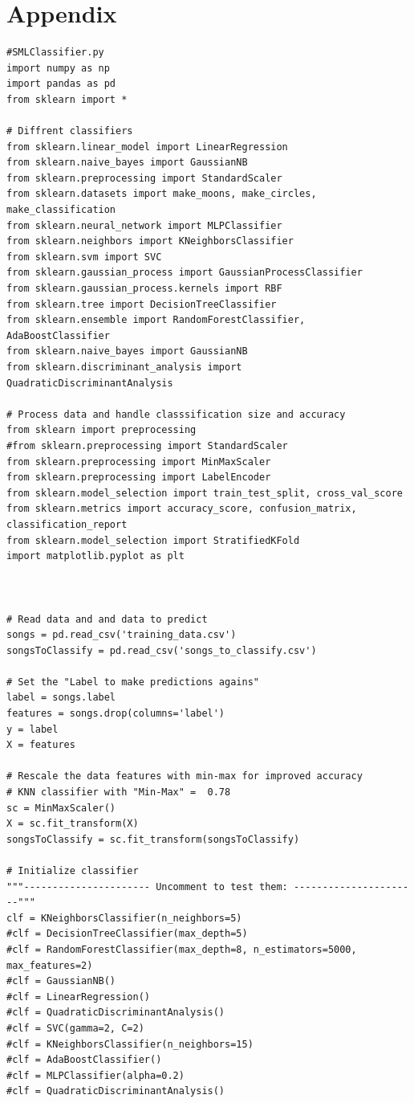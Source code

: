 \documentclass{article}
\begin{document}
\section*{Appendix}
\begin{verbatim}
#SMLClassifier.py
import numpy as np
import pandas as pd
from sklearn import *

# Diffrent classifiers
from sklearn.linear_model import LinearRegression  
from sklearn.naive_bayes import GaussianNB
from sklearn.preprocessing import StandardScaler
from sklearn.datasets import make_moons, make_circles, make_classification
from sklearn.neural_network import MLPClassifier
from sklearn.neighbors import KNeighborsClassifier
from sklearn.svm import SVC
from sklearn.gaussian_process import GaussianProcessClassifier
from sklearn.gaussian_process.kernels import RBF
from sklearn.tree import DecisionTreeClassifier
from sklearn.ensemble import RandomForestClassifier, AdaBoostClassifier
from sklearn.naive_bayes import GaussianNB
from sklearn.discriminant_analysis import QuadraticDiscriminantAnalysis

# Process data and handle classsification size and accuracy
from sklearn import preprocessing
#from sklearn.preprocessing import StandardScaler
from sklearn.preprocessing import MinMaxScaler
from sklearn.preprocessing import LabelEncoder
from sklearn.model_selection import train_test_split, cross_val_score
from sklearn.metrics import accuracy_score, confusion_matrix, classification_report
from sklearn.model_selection import StratifiedKFold
import matplotlib.pyplot as plt



# Read data and and data to predict
songs = pd.read_csv('training_data.csv')
songsToClassify = pd.read_csv('songs_to_classify.csv')

# Set the "Label to make predictions agains"
label = songs.label                         
features = songs.drop(columns='label')      
y = label
X = features

# Rescale the data features with min-max for improved accuracy 
# KNN classifier with "Min-Max" =  0.78
sc = MinMaxScaler()
X = sc.fit_transform(X)
songsToClassify = sc.fit_transform(songsToClassify)

# Initialize classifier
"""---------------------- Uncomment to test them: ----------------------"""
clf = KNeighborsClassifier(n_neighbors=5)
#clf = DecisionTreeClassifier(max_depth=5)
#clf = RandomForestClassifier(max_depth=8, n_estimators=5000, max_features=2) 
#clf = GaussianNB()
#clf = LinearRegression()
#clf = QuadraticDiscriminantAnalysis() 
#clf = SVC(gamma=2, C=2)
#clf = KNeighborsClassifier(n_neighbors=15) 
#clf = AdaBoostClassifier()
#clf = MLPClassifier(alpha=0.2)
#clf = QuadraticDiscriminantAnalysis() 





\end{verbatim}
\end{document}
